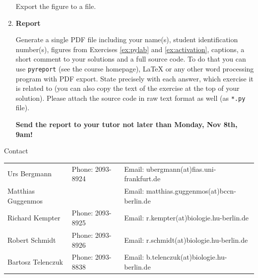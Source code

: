 \documentclass[12pt, a4]{article}
\begin{document}
\begin{enumerate}
\begin{enumerate}
        \end{enumerate}
    
        Export the figure to a file.

    \item \textbf {Report}

    Generate a single PDF file including your name(s), student identification
    number(s), figures from Exercises \ref{ex:pylab} and \ref{ex:activation},
    captions, a short comment to your solutions and a full source code. To do
    that you can use  \texttt{pyreport} (see the course homepage), LaTeX or any
    other word processing program with PDF export. State precisely with each
    answer, which exercise it is related to (you can also copy the text of the
    exercise at the top of your solution). Please attach the source code in raw
    text format as well (as \texttt{*.py} file).
    
    \textbf{Send the report to your tutor not later than Monday, Nov
    8th, 9am!} 
\end{enumerate}

\vfill
\centerline{\CAP Contact}
\CAP

\begin{tabular}{lll}
Urs Bergmann & Phone: 2093-8924 & Email: ubergmann(at)fias.uni-frankfurt.de \\
Matthias Guggenmos & & Email: matthias.guggenmos(at)bccn-berlin.de \\
Richard Kempter \hfill & Phone: 2093-8925 \hfill & Email: r.kempter(at)biologie.hu-berlin.de \\
Robert Schmidt & Phone: 2093-8926 & Email: r.schmidt(at)biologie.hu-berlin.de \\
Bartosz Telenczuk & Phone: 2093-8838 & Email: b.telenczuk(at)biologie.hu-berlin.de \\
\end{tabular}
\end{document}
